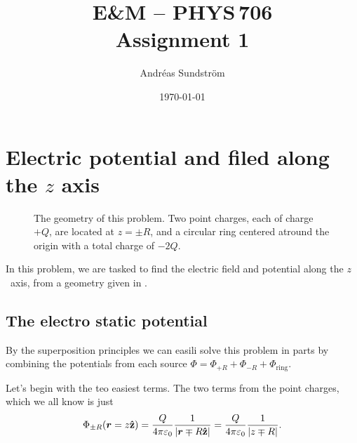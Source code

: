\documentclass[11pt,letter, swedish, english
]{article}
\newcommand{\enaught}{\ensuremath\varepsilon_0}
\begin{document}




\title{E\&M -- PHYS\,706 \\
Assignment 1}
\author{Andréas Sundström}
\date{\today}

\maketitle


\section{Electric potential and filed along the $z$ axis}
\begin{figure}\centering

\caption{The geometry of this problem. Two point charges, each of
  charge $+Q$, are located at $z=\pm R$, and a circular ring centered
  atround the origin with a total charge of $-2Q$.}
\label{fig:1_geometry}
\end{figure}

In this problem, we are tasked to find the electric field and
potential along the $z$~axis, from a geometry given in
. 

\subsection{The electro static potential}
By the superposition principles we can easili solve this problem in
parts by combining the potentials from each source
$\Phi=\Phi_{+R}+\Phi_{-R}+\Phi_{\text{ring}}$. 

Let's begin with the teo easiest terms. The two terms from the point
charges, which we all know is just
\begin{equation}\label{eq:1_Phi_dot}
\Phi_{\pm{R}}(\vb*r=z\vu{z})=\frac{Q}{4\pi\enaught}
\frac{1}{\abs{\vb*r\mp R\vu{z}}}
=\frac{Q}{4\pi\enaught} \frac{1}{\abs{z\mp R}}.
\end{equation}
\end{document}
